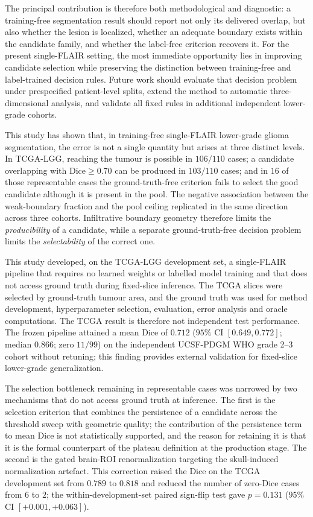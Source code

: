 \documentclass[11pt,a4paper]{article}
\begin{document}
The principal contribution is therefore both methodological and diagnostic: a
training-free segmentation result should report not only its delivered overlap,
but also whether the lesion is localized, whether an adequate boundary exists
within the candidate family, and whether the label-free criterion recovers it.
For the present single-FLAIR setting, the most immediate opportunity lies in
improving candidate selection while preserving the distinction between
training-free and label-trained decision rules. Future work should evaluate that
decision problem under prespecified patient-level splits, extend the method to
automatic three-dimensional analysis, and validate all fixed rules in additional
independent lower-grade cohorts.

\iffalse %

This study has shown that, in training-free single-FLAIR lower-grade glioma
segmentation, the error is not a single quantity but arises at three distinct
levels. In TCGA-LGG, reaching the tumour is possible in $106/110$ cases; a
candidate overlapping with Dice$\ge0.70$ can be produced in $103/110$ cases; and in
$16$ of those representable cases the ground-truth-free criterion fails to select
the good candidate although it is present in the pool. The negative association
between the weak-boundary fraction and the pool ceiling replicated in the same
direction across three cohorts. Infiltrative boundary geometry therefore limits the
\emph{producibility} of a candidate, while a separate ground-truth-free decision
problem limits the \emph{selectability} of the correct one.

This study developed, on the TCGA-LGG development set, a single-FLAIR pipeline that
requires no learned weights or labelled model training and that does not access
ground truth during fixed-slice inference. The TCGA slices were selected by
ground-truth tumour area, and the ground truth was used for method development,
hyperparameter selection, evaluation, error analysis and oracle computations. The
TCGA result is therefore not independent test performance. The frozen pipeline
attained a mean Dice of $0.712$ ($95\%$ CI $[0.649,0.772]$; median $0.866$; zero
$11/99$) on the independent UCSF-PDGM WHO grade 2--3 cohort without retuning; this
finding provides external validation for fixed-slice lower-grade generalization.

The selection bottleneck remaining in representable cases was narrowed by two
mechanisms that do not access ground truth at inference. The first is the selection
criterion that combines the persistence of a candidate across the threshold sweep
with geometric quality; the contribution of the persistence term to mean Dice is
not statistically supported, and the reason for retaining it is that it is the
formal counterpart of the plateau definition at the production stage. The second is
the gated brain-ROI renormalization targeting the skull-induced normalization
artefact. This correction raised the Dice on the TCGA development set from $0.789$
to $\mathbf{0.818}$ and reduced the number of zero-Dice cases from $6$ to $2$; the
within-development-set paired sign-flip test gave $p{=}0.131$ ($95\%$ CI
$[+0.001,+0.063]$).
\end{document}
